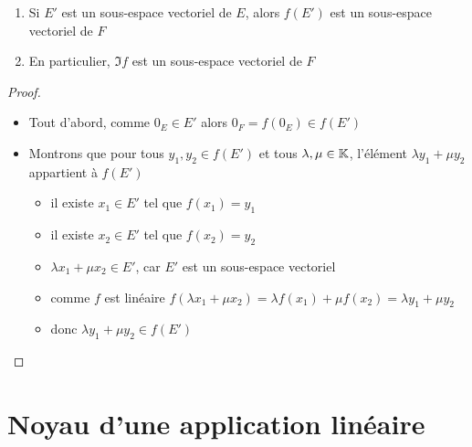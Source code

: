 \begin{frame}

\begin{proposition}
\begin{enumerate}
  \item Si $E'$ est un sous-espace vectoriel de $E$, 
  alors $f(E')$ est un sous-espace vectoriel de $F$
  
  \item En particulier, $\Im f$ est un sous-espace vectoriel de $F$
\end{enumerate}
 \end{proposition}
 
\begin{proof}

\pause

\begin{itemize}
  \item Tout d'abord, comme $0_{E} \in E'$ alors $0_{F} = f(0_{E}) \in f(E')$

\pause  
  \item Montrons que pour tous $y_1,y_2 \in f(E')$ et tous $\lambda,\mu \in \mathbb{K}$, 
  l'élément $\lambda y_1 + \mu y_2$ appartient à $f(E')$
\pause  
  \begin{itemize}
    \item il existe $x_1\in E'$ tel que $f(x_1)=y_1$
\pause     
    \item il existe $x_2\in E'$ tel que $f(x_2)=y_2$
\pause     
    \item $\lambda x_1 + \mu x_2 \in E'$, car $E'$ est un sous-espace vectoriel
\pause 
    \item comme $f$ est linéaire $f(\lambda x_1+ \mu x_2)=\lambda f(x_1)+ \mu f(x_2) =\lambda y_1 + \mu y_2$
\pause    
    \item donc $\lambda y_1 + \mu y_2 \in f(E')$ \qedhere
  \end{itemize}
\end{itemize}


\end{proof}
\end{frame}


\section{Noyau d'une application linéaire}

